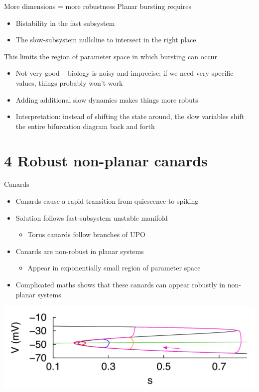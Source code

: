 \documentclass[presentation]{beamer}
\begin{document}
\begin{frame}[label={sec:org1b23cbe}]{More dimensions = more robustness}
Planar bursting requires
\begin{itemize}
\item Bistability in the fast subsystem
\item The slow-subsystem nullcline to intersect in the right place
\end{itemize}
\vfill
This limits the region of parameter space in which bursting can occur
\begin{itemize}
\item Not very good -- biology is noisy and imprecise; if we need very specific values, things probably won't work
\item Adding additional slow dynamics makes things more robuts
\item Interpretation: instead of shifting the state around, the slow variables shift the entire bifurcation diagram back and forth
\end{itemize}
\end{frame}
\section{4 Robust non-planar canards}
\label{sec:org69bcf66}
\begin{frame}[label={sec:orge673fd0}]{Canards}
\begin{itemize}
\item Canards cause a rapid transition from quiescence to spiking
\item Solution follows fast-subsystem unstable manifold
\begin{itemize}
\item Torus canards follow branches of UPO
\end{itemize}
\item Canards are non-robust in planar systems
\begin{itemize}
\item Appear in exponentially small region of parameter space
\end{itemize}
\item Complicated maths shows that these canards can appear robustly in non-planar systems
\end{itemize}

\begin{center}
\includegraphics[width=.85\textwidth]{./planarcanard.png}
\end{center}
\end{frame}
\end{document}
